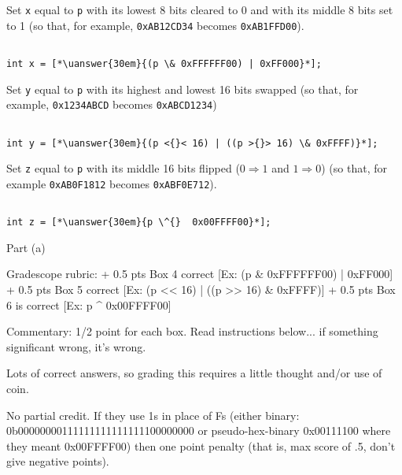 \subpart %
Set \lstinline'x' equal to \lstinline'p' with its lowest 8 bits
cleared to 0 and with its middle 8 bits set to 1 (so that, for
example, \lstinline'0xAB12CD34' becomes \lstinline'0xAB1FFD00').
\begin{framed}
\begin{lstlisting}[aboveskip=-5pt, belowskip=-5pt]

int x = [*\uanswer{30em}{(p \& 0xFFFFFF00) | 0xFF000}*];
\end{lstlisting}
\end{framed}

\subpart %
Set \lstinline'y' equal to \lstinline'p' with its highest and lowest
16 bits swapped (so that, for example, \lstinline'0x1234ABCD' becomes
\lstinline'0xABCD1234')
\begin{framed}
\begin{lstlisting}[aboveskip=-5pt, belowskip=-5pt]

int y = [*\uanswer{30em}{(p <{}< 16) | ((p >{}> 16) \& 0xFFFF)}*];
\end{lstlisting}
\end{framed}

\subpart %
Set \lstinline'z' equal to \lstinline'p' with its middle 16 bits
flipped ($0 \Longrightarrow 1$ and $1 \Longrightarrow 0$) (so that,
for example \lstinline'0xAB0F1812' becomes \lstinline'0xABF0E712').
\begin{framed}
\begin{lstlisting}[aboveskip=-5pt, belowskip=-5pt]

int z = [*\uanswer{30em}{p \^{}  0x00FFFF00}*];
\end{lstlisting}
\end{framed}

\RUBRIC
Part (a)

Gradescope rubric:
+ 0.5 pts Box 4 correct [Ex: (p & 0xFFFFFF00) | 0xFF000]
+ 0.5 pts Box 5 correct [Ex: (p << 16) | ((p >> 16) & 0xFFFF)]
+ 0.5 pts Box 6 is correct [Ex: p ^ 0x00FFFF00]

Commentary:
1/2 point for each box. Read instructions below... if something significant wrong, it's wrong.

Lots of correct answers, so grading this requires a little thought and/or
use of coin.

No partial credit. If they use 1s in place of Fs (either binary:
0b00000000111111111111111100000000 or pseudo-hex-binary 0x00111100
where they meant 0x00FFFF00) then one point penalty (that is, max
score of .5, don't give negative points).

